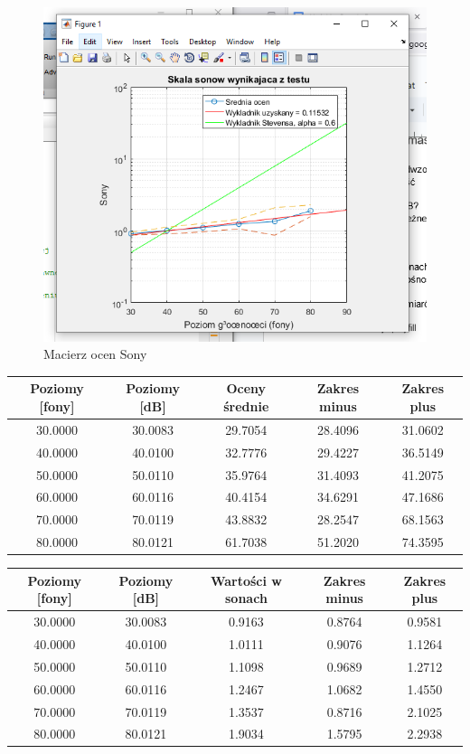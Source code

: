 \documentclass[12pt]{article}
\begin{document}
\begin{figure}[H]
    \centering
    \includegraphics[width=\textwidth]{sony.png}
    \caption{Macierz ocen Sony}
\end{figure}
\begin{table}[H]
\centering
\begin{tabular}{|c|c|c|c|c|}
\hline
Poziomy [fony] & Poziomy [dB] & Oceny średnie & Zakres minus & Zakres plus \\ \hline
30.0000 & 30.0083 & 29.7054 & 28.4096 & 31.0602 \\ \hline
40.0000 & 40.0100 & 32.7776 & 29.4227 & 36.5149 \\ \hline
50.0000 & 50.0110 & 35.9764 & 31.4093 & 41.2075 \\ \hline
60.0000 & 60.0116 & 40.4154 & 34.6291 & 47.1686 \\ \hline
70.0000 & 70.0119 & 43.8832 & 28.2547 & 68.1563 \\ \hline
80.0000 & 80.0121 & 61.7038 & 51.2020 & 74.3595 \\ \hline
\end{tabular}
\end{table}

\begin{table}[H]
\centering
\begin{tabular}{|c|c|c|c|c|}
\hline
Poziomy [fony] & Poziomy [dB] & Wartości w sonach & Zakres minus & Zakres plus \\ \hline
30.0000 & 30.0083 & 0.9163 & 0.8764 & 0.9581 \\ \hline
40.0000 & 40.0100 & 1.0111 & 0.9076 & 1.1264 \\ \hline
50.0000 & 50.0110 & 1.1098 & 0.9689 & 1.2712 \\ \hline
60.0000 & 60.0116 & 1.2467 & 1.0682 & 1.4550 \\ \hline
70.0000 & 70.0119 & 1.3537 & 0.8716 & 2.1025 \\ \hline
80.0000 & 80.0121 & 1.9034 & 1.5795 & 2.2938 \\ \hline
\end{tabular}
\end{table}
\end{document}
